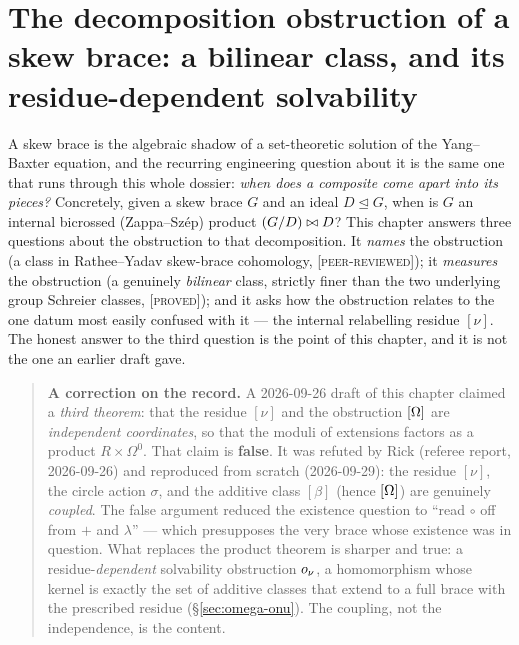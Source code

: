 \chapter{The decomposition obstruction of a skew brace: a bilinear class, and its residue-dependent solvability}
\label{ch:skewbrace-omega}

A skew brace is the algebraic shadow of a set-theoretic solution of the
Yang--Baxter equation, and the recurring engineering question about it is the
same one that runs through this whole dossier: \emph{when does a composite come
apart into its pieces?} Concretely, given a skew brace $G$ and an ideal
$D\trianglelefteq G$, when is $G$ an internal bicrossed (Zappa--Sz\'ep) product
$(G/D)\bowtie D$? This chapter answers three questions about the obstruction to that
decomposition. It \emph{names} the obstruction (a class in Rathee--Yadav skew-brace
cohomology, \textsc{[peer-reviewed]}); it \emph{measures} the obstruction (a
genuinely \emph{bilinear} class, strictly finer than the two underlying group
Schreier classes, \textsc{[proved]}); and it asks how the obstruction relates to the
one datum most easily confused with it --- the internal relabelling residue
$[\nu]$. The honest answer to the third question is the point of this chapter, and
it is not the one an earlier draft gave.

\begin{quote}\small
\textbf{A correction on the record.} A 2026-09-26 draft of this chapter claimed a
\emph{third theorem}: that the residue $[\nu]$ and the obstruction $[\Omega]$ are
\emph{independent coordinates}, so that the moduli of extensions factors as a
product $R\times\Omega^0$. That claim is \textbf{false}. It was refuted by Rick
(referee report, 2026-09-26) and reproduced from scratch (2026-09-29): the
residue $[\nu]$, the circle action $\sigma$, and the additive class $[\beta]$
(hence $[\Omega]$) are genuinely \emph{coupled}. The false argument reduced the
existence question to ``read $\circ$ off from $+$ and $\lambda$'' --- which
presupposes the very brace whose existence was in question. What replaces the
product theorem is sharper and true: a residue-\emph{dependent} solvability
obstruction $o_\nu$, a homomorphism whose kernel is exactly the set of additive
classes that extend to a full brace with the prescribed residue
(\S\ref{sec:omega-onu}). The coupling, not the independence, is the content.
\end{quote}


